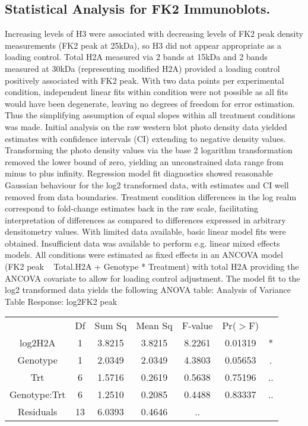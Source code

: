 \subsection{Statistical Analysis for FK2 Immunoblots.}
Increasing levels of H3 were associated with decreasing levels of FK2 peak density measurements (FK2 peak at 25kDa), so H3 did not appear appropriate as a loading control. Total H2A measured via 2 bands at 15kDa and 2 bands measured at 30kDa (representing modified H2A) provided a loading control positively associated with FK2 peak. With two data points per experimental condition, independent linear fits within condition were not possible as all fits would have been degenerate, leaving no degrees of freedom for error estimation.  Thus the simplifying assumption of equal slopes within all treatment conditions was made. Initial analysis on the raw western blot photo density data yielded estimates with confidence intervals (CI) extending to negative density values. Transforming the photo density values via the base 2 logarithm transformation removed the lower bound of zero, yielding an unconstrained data range from minus to plus infinity. Regression model fit diagnostics showed reasonable Gaussian behaviour for the log2 transformed data, with estimates and CI well removed from data boundaries.  Treatment condition differences in the log realm correspond to fold-change estimates back in the raw scale, facilitating interpretation of differences as compared to differences expressed in arbitrary densitometry values. With limited data available, basic linear model fits were obtained. Insufficient data was available to perform e.g. linear mixed effects models.  All conditions were estimated as fixed effects in an ANCOVA model (FK2 peak ~ Total.H2A + Genotype * Treatment) with total H2A providing the ANCOVA covariate to allow for loading control adjustment. The model fit to the log2 transformed data yields the following ANOVA table:
\newline
Analysis of Variance Table
\newline
Response: log2FK2 peak
\begin{center}
\begin{tabular}{ c c c c c c c}
 & Df & Sum Sq & Mean Sq & F-value & Pr($>$F) \\
log2H2A & 1 & 3.8215 & 3.8215 & 8.2261 & 0.01319 & * \\
Genotype & 1 & 2.0349 & 2.0349 & 4.3803 & 0.05653 & . \\
Trt & 6 & 1.5716 & 0.2619 & 0.5638 & 0.75196 & .. \\ 
Genotype:Trt & 6 & 1.2510 & 0.2085 & 0.4488 & 0.83337 & .. \\
Residuals & 13 & 6.0393 & 0.4646 & .. \\
\end{tabular}
\end{center}
